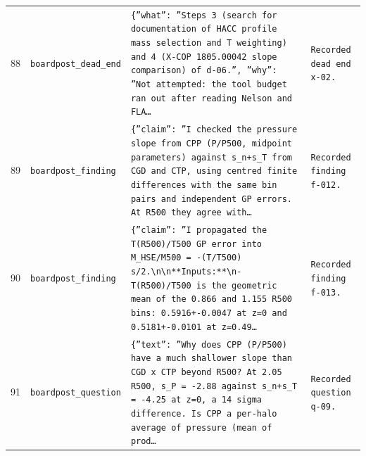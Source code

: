 \documentclass[11pt,a4paper]{article}
\begin{document}
\begin{longtable}{@{}p{}p{}p{}p{}@{}}
88 & \texttt{board}\newline\texttt{post\_\allowbreak{}dead\_\allowbreak{}end} & \texttt{\{''what'':\allowbreak{} ''Steps 3 (search for documentation of HACC profile mass selection and T weighting)\allowbreak{} and 4 (X-COP 1805.00042 slope comparison)\allowbreak{} of d-06.'',\allowbreak{} ''why'':\allowbreak{} ''Not attempted:\allowbreak{} the tool budget ran out after reading Nelson and FLA\ldots{}\allowbreak{}} & \texttt{Recorded dead end x-02.} \\
89 & \texttt{board}\newline\texttt{post\_\allowbreak{}finding} & \texttt{\{''claim'':\allowbreak{} ''I checked the pressure slope from CPP (P/\allowbreak{}P500,\allowbreak{} midpoint parameters)\allowbreak{} against s\_\allowbreak{}n+s\_\allowbreak{}T from CGD and CTP,\allowbreak{} using centred finite differences with the same bin pairs and independent GP errors. At R500 they agree with\ldots{}\allowbreak{}} & \texttt{Recorded finding f-012.} \\
90 & \texttt{board}\newline\texttt{post\_\allowbreak{}finding} & \texttt{\{''claim'':\allowbreak{} ''I propagated the T(R500)\allowbreak{}/\allowbreak{}T500 GP error into M\_\allowbreak{}HSE/\allowbreak{}M500 =\allowbreak{} -(T/\allowbreak{}T500)\allowbreak{} s/\allowbreak{}2.\textbackslash{}\allowbreak{}n\textbackslash{}\allowbreak{}n**Inputs:\allowbreak{}**\textbackslash{}\allowbreak{}n- T(R500)\allowbreak{}/\allowbreak{}T500 is the geometric mean of the 0.866 and 1.155 R500 bins:\allowbreak{} 0.5916+-0.0047 at z=\allowbreak{}0 and 0.5181+-0.0101 at z=\allowbreak{}0.49\ldots{}\allowbreak{}} & \texttt{Recorded finding f-013.} \\
91 & \texttt{board}\newline\texttt{post\_\allowbreak{}question} & \texttt{\{''text'':\allowbreak{} ''Why does CPP (P/\allowbreak{}P500)\allowbreak{} have a much shallower slope than CGD x CTP beyond R500? At 2.05 R500,\allowbreak{} s\_\allowbreak{}P =\allowbreak{} -2.88 against s\_\allowbreak{}n+s\_\allowbreak{}T =\allowbreak{} -4.25 at z=\allowbreak{}0,\allowbreak{} a 14 sigma difference. Is CPP a per-halo average of pressure (mean of prod\ldots{}\allowbreak{}} & \texttt{Recorded question q-09.} \\
\bottomrule\end{longtable}
\end{document}
